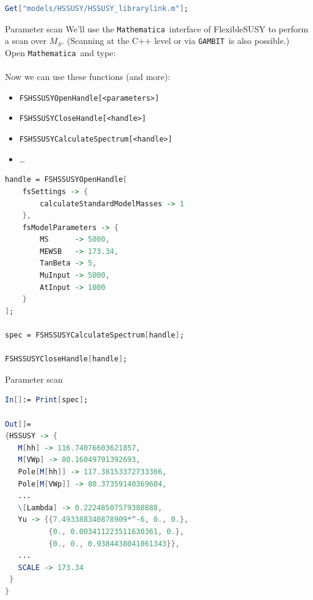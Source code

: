 \documentclass[hyperref={pdfpagelabels=false},ngerman]{beamer}
\newcommand{\MS}{\ensuremath{M_S}}
\newcommand{\Mathematica}{\texttt{Mathematica}}
\newcommand{\GAMBIT}{\texttt{GAMBIT}}
\begin{document}
\begin{lrbox}{\listbox}\begin{lstlisting}[language=Mathematica]
Get["models/HSSUSY/HSSUSY_librarylink.m"];
\end{lstlisting}\end{lrbox} %

\begin{frame}{Parameter scan}
  We'll use the \Mathematica\ interface of FlexibleSUSY to perform a
  scan over $\MS$.  (Scanning at the C++ level or via \GAMBIT\ is also possible.)\\[1em]
  Open \Mathematica\ and type:\\[2em]
  \usebox{\listbox}
  \\[1em]
  Now we can use these functions (and more):\\
  \begin{itemize}
  \item[] \texttt{FSHSSUSYOpenHandle[<parameters>]}
  \item[] \texttt{FSHSSUSYCloseHandle[<handle>]}
  \item[] \texttt{FSHSSUSYCalculateSpectrum[<handle>]}
  \item[] \ldots
  \end{itemize}
\end{frame}

\begin{lrbox}{\listbox}\begin{lstlisting}[language=Mathematica]
handle = FSHSSUSYOpenHandle[
    fsSettings -> {
        calculateStandardModelMasses -> 1
    },
    fsModelParameters -> {
        MS      -> 5000,
        MEWSB   -> 173.34,
        TanBeta -> 5,
        MuInput -> 5000,
        AtInput -> 1000
    }
];

spec = FSHSSUSYCalculateSpectrum[handle];

FSHSSUSYCloseHandle[handle];
\end{lstlisting}\end{lrbox} %

\begin{frame}{Parameter scan}
  \usebox{\listbox}
\end{frame}

\begin{lrbox}{\listbox}\begin{lstlisting}[language=Mathematica]
In[]:= Print[spec];

Out[]=
{HSSUSY -> {
   M[hh] -> 116.74076603621857,
   M[VWp] -> 80.16049791392693,
   Pole[M[hh]] -> 117.38153372733366,
   Pole[M[VWp]] -> 80.37359140369604,
   ...
   \[Lambda] -> 0.22248507579380888,
   Yu -> {{7.493388340878909*^-6, 0., 0.},
          {0., 0.003411223511630361, 0.},
          {0., 0., 0.9384438041061343}},
   ...
   SCALE -> 173.34
 }
}
\end{lstlisting}\end{lrbox} %
\end{document}

